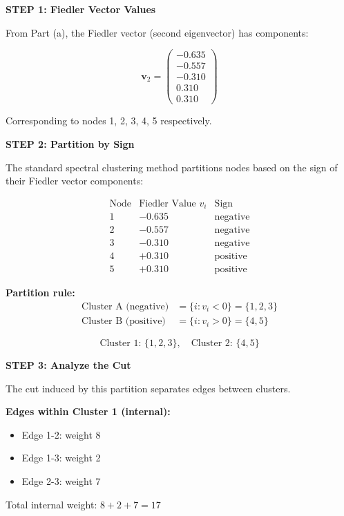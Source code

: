 \documentclass[12pt]{article}
\begin{document}
\begin{solution}

\textbf{STEP 1: Fiedler Vector Values}

From Part (a), the Fiedler vector (second eigenvector) has components:

\[
\mathbf{v}_2 = \begin{pmatrix} -0.635 \\ -0.557 \\ -0.310 \\ 0.310 \\ 0.310 \end{pmatrix}
\]

Corresponding to nodes 1, 2, 3, 4, 5 respectively.

\textbf{STEP 2: Partition by Sign}

The standard spectral clustering method partitions nodes based on the sign of their Fiedler vector components:

\[
\begin{array}{c|c|c}
\text{Node} & \text{Fiedler Value } v_i & \text{Sign} \\
\hline
1 & -0.635 & \text{negative} \\
2 & -0.557 & \text{negative} \\
3 & -0.310 & \text{negative} \\
4 & +0.310 & \text{positive} \\
5 & +0.310 & \text{positive}
\end{array}
\]

\textbf{Partition rule:}
\begin{align*}
\text{Cluster A (negative)} &= \{i : v_i < 0\} = \{1, 2, 3\} \\
\text{Cluster B (positive)} &= \{i : v_i > 0\} = \{4, 5\}
\end{align*}

\[
\boxed{\text{Cluster 1: } \{1, 2, 3\}, \quad \text{Cluster 2: } \{4, 5\}}
\]

\textbf{STEP 3: Analyze the Cut}

The cut induced by this partition separates edges between clusters.

\textbf{Edges within Cluster 1 (internal):}
\begin{itemize}
    \item Edge 1-2: weight 8
    \item Edge 1-3: weight 2
    \item Edge 2-3: weight 7
\end{itemize}
Total internal weight: $8 + 2 + 7 = 17$


\end{solution}
\end{document}
